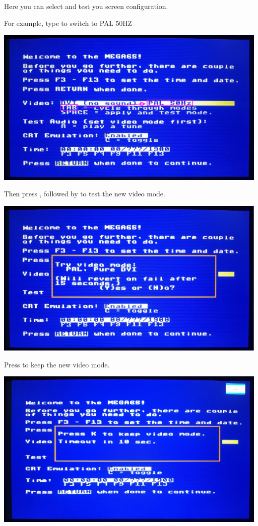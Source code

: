 Here you can select and test you screen configuration.

For example, type  to switch to PAL 50HZ

\begin{center}
  \includegraphics[width=\linewidth]{images/img011_final_boot_02.png}
\end{center}

Then press  , followed by  to test the new video mode.

\begin{center}
  \includegraphics[width=\linewidth]{images/img011_final_boot_03.jpg}
\end{center}

Press  to keep the new video mode.

\begin{center}
  \includegraphics[width=\linewidth]{images/img011_final_boot_04.jpg}
\end{center}

